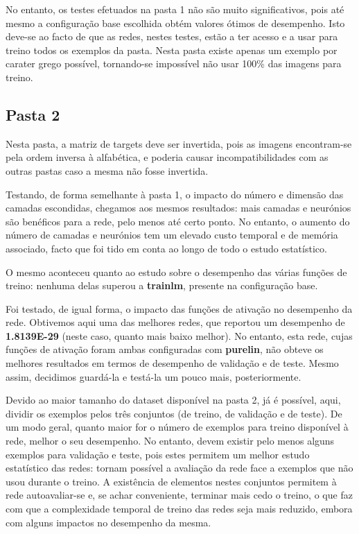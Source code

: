 \documentclass[11pt]{article}
\begin{document}
	No entanto, os testes efetuados na pasta 1 não são muito significativos, pois até mesmo a configuração base escolhida obtém valores ótimos de desempenho. Isto deve-se ao facto de que as redes, nestes testes, estão a ter acesso e a usar para treino todos os exemplos da pasta. Nesta pasta existe apenas um exemplo por carater grego possível, tornando-se impossível não usar 100\% das imagens para treino.
	
	
	\large
	\subsection{Pasta 2}
	\normalsize
	
	Nesta pasta, a matriz de targets deve ser invertida, pois as imagens encontram-se pela ordem inversa à alfabética, e poderia causar incompatibilidades com as outras pastas caso a mesma não fosse invertida.
	
	Testando, de forma semelhante à pasta 1, o impacto do número e dimensão das camadas escondidas, chegamos aos mesmos resultados: mais camadas e neurónios são benéficos para a rede, pelo menos até certo ponto. No entanto, o aumento do número de camadas e neurónios tem um elevado custo temporal e de memória associado, facto que foi tido em conta ao longo de todo o estudo estatístico.
	
	O mesmo aconteceu quanto ao estudo sobre o desempenho das várias funções de treino: nenhuma delas superou a \textbf{trainlm}, presente na configuração base.
	
	Foi testado, de igual forma, o impacto das funções de ativação no desempenho da rede. Obtivemos aqui uma das melhores redes, que reportou um desempenho de \textbf{1.8139E-29} (neste caso, quanto mais baixo melhor). No entanto, esta rede, cujas funções de ativação foram ambas configuradas com \textbf{purelin}, não obteve os melhores resultados em termos de desempenho de validação e de teste. Mesmo assim, decidimos guardá-la e testá-la um pouco mais, posteriormente.
	
	Devido ao maior tamanho do dataset disponível na pasta 2, já é possível, aqui, dividir os exemplos pelos três conjuntos (de treino, de validação e de teste). De um modo geral, quanto maior for o número de exemplos para treino disponível à rede, melhor o seu desempenho. No entanto, devem existir pelo menos alguns exemplos para validação e teste, pois estes permitem um melhor estudo estatístico das redes: tornam possível a avaliação da rede face a exemplos que não usou durante o treino. A existência de elementos nestes conjuntos permitem à rede autoavaliar-se e, se achar conveniente, terminar mais cedo o treino, o que faz com que a complexidade temporal de treino das redes seja mais reduzido, embora com alguns impactos no desempenho da mesma.
	
\end{document}

